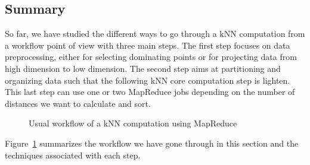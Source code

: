 \subsection{Summary}
So far, we have studied the different ways to go through a kNN computation from a workflow point of view with three main steps.
The first step focuses on data preprocessing, either for selecting dominating points or for projecting data from high dimension to low dimension.
The second step aims at partitioning and organizing data such that the following kNN core computation step is lighten. This last step can use one or two MapReduce jobs depending on the number of distances we want to calculate and sort.
\begin{figure}[htp]
\center
{}
\caption{Usual workflow of a kNN computation using MapReduce \label{workflow}}
\end{figure}
Figure~\ref{workflow} summarizes the 
workflow we have gone through in this section and the techniques associated with each step.

